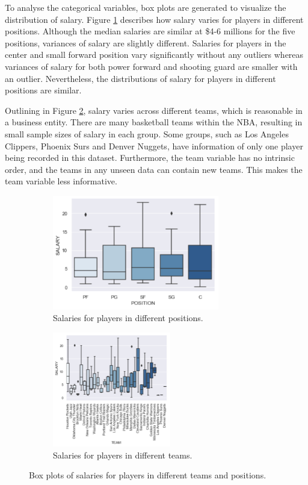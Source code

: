 \documentclass[letterpaper,12pt,twoside,]{pinp}
\begin{document}
To analyse the categorical variables, box plots are generated to
visualize the distribution of salary. Figure \ref{fig:position}
describes how salary varies for players in different positions. Although
the median salaries are similar at \$4-6 millions for the five
positions, variances of salary are slightly different. Salaries for
players in the center and small forward position vary significantly
without any outliers whereas variances of salary for both power forward
and shooting guard are smaller with an outlier. Nevertheless, the
distributions of salary for players in different positions are similar.

Outlining in Figure \ref{fig:team}, salary varies across different
teams, which is reasonable in a business entity. There are many
basketball teams within the NBA, resulting in small sample sizes of
salary in each group. Some groups, such as Los Angeles Clippers, Phoenix
Surs and Denver Nuggets, have information of only one player being
recorded in this dataset. Furthermore, the team variable has no
intrinsic order, and the teams in any unseen data can contain new teams.
This makes the team variable less informative.

\begin{figure}[H]
\begin{subfigure}{0.5\textwidth}
\includegraphics[width=0.9\linewidth, height=5cm]{position_box.png}
\centering
\caption{Salaries for players in different positions.}
\label{fig:position}
\end{subfigure}
\begin{subfigure}{0.5\textwidth}
\includegraphics[width=0.9\linewidth, height=5cm]{team_box.png}
\centering
\caption{Salaries for players in different teams.}
\label{fig:team}
\end{subfigure}
\caption{Box plots of salaries for players in different teams and positions.}
\label{fig:boxes}
\end{figure}
\end{document}
